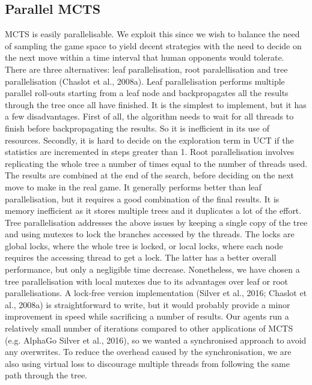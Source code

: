 \documentclass[a4paper,12pt]{proposal}
\begin{document}
\subsection{Parallel MCTS}
MCTS is easily parallelisable. We exploit this since we wish to balance the need of sampling the game space to yield decent strategies with the need to decide on the next move within a time interval that human opponents would tolerate. There are three alternatives: leaf parallelisation, root paralellisation and tree parallelisation (Chaslot et al., 2008a). Leaf parallelisation performs multiple parallel roll-outs starting from a leaf node and backpropagates all the results through the tree once all have finished. It is the simplest to implement, but it has a few disadvantages. First of all, the algorithm needs to wait for all threads to finish before backpropagating the results. So it is inefficient in its use of resources. Secondly, it is hard to decide on the exploration term in UCT if the statistics are incremented in steps greater than 1. Root parallelisation involves replicating the whole tree a number of times equal to the number of threads used. The results are combined at the end of the search, before deciding on the next move to make in the real game. It generally performs better than leaf parallelisation, but it requires a good combination of the final results. It is memory inefficient as it stores multiple trees and it duplicates a lot of the effort. Tree parallelisation addresses the above issues by keeping a single copy of the tree and using mutexes to lock the branches accessed by the threads. The locks are global locks, where the whole tree is locked, or local locks, where each node requires the accessing thread to get a lock. The latter has a better overall performance, but only a negligible time decrease. Nonetheless, we have chosen a tree parallelisation with local mutexes due to its advantages over leaf or root parallelisations. A lock-free version implementation (Silver et al., 2016; Chaslot et al., 2008a) is straightforward to write, but it would probably provide a minor improvement in speed while sacrificing a number of results. Our agents run a relatively small number of iterations compared to other applications of MCTS (e.g. AlphaGo Silver et al., 2016), so we wanted a synchronised approach to avoid any overwrites. To reduce the overhead caused by the synchronisation, we are also using virtual loss to discourage multiple threads from following the same path through the tree.
\end{document}
